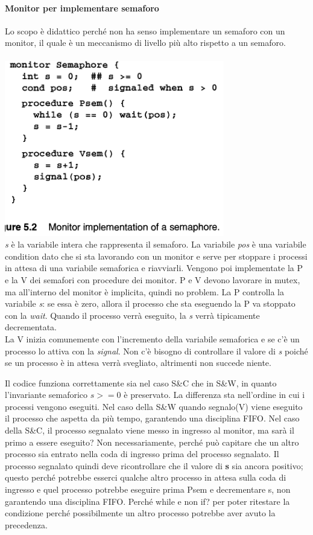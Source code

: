 \documentclass[10pt,a4paper]{book}
\begin{document}
\paragraph{Monitor per implementare semaforo}
Lo scopo è didattico perché non ha senso implementare un semaforo con un monitor, il quale è un meccanismo di livello più alto rispetto a un semaforo.\\ \\
\includegraphics[scale=0.51]{img/monsem.png} \\
\textit{s} è la variabile intera che rappresenta il semaforo. La variabile \textit{pos} è una variabile condition dato che si sta lavorando con un monitor e serve per stoppare i processi in attesa di una variabile semaforica e riavviarli.
Vengono poi implementate la P e la V dei semafori con procedure dei monitor.
P e V devono lavorare in mutex, ma all'interno del monitor è implicita, quindi no problem.
La P controlla la variabile \textit{s}: se essa è zero, allora il processo che sta eseguendo la P va stoppato con la \textit{wait}. Quando il processo verrà eseguito, la \textit{s} verrà tipicamente decrementata.\\
La V inizia comunemente con l'incremento della variabile semaforica e se c'è un processo lo attiva con la \textit{signal}. Non c'è bisogno di controllare il valore di \textit{s} poiché se un processo è in attesa verrà svegliato, altrimenti non succede niente.

Il codice funziona correttamente sia nel caso S\&C che in S\&W, in quanto l'invariante semaforico $ s>=0 $ è preservato. La differenza sta nell'ordine in cui i processi vengono eseguiti.
Nel caso della S\&W quando segnalo(V) viene eseguito il processo che aspetta da più tempo, garantendo una disciplina FIFO. 
Nel caso della S\&C, il processo segnalato viene messo in ingresso al monitor, ma sarà il primo a essere eseguito? Non necessariamente, perché può capitare che un altro processo sia entrato nella coda di ingresso prima del processo segnalato. Il processo  segnalato quindi deve ricontrollare che il valore di \textbf{s} sia ancora positivo; questo perché potrebbe esserci qualche altro processo in attesa sulla coda di ingresso e quel processo potrebbe eseguire prima Psem e decrementare s, non garantendo una disciplina FIFO.
Perché while e non if? per poter ritestare la condizione perché possibilmente un altro processo potrebbe aver avuto la precedenza.
\end{document}
